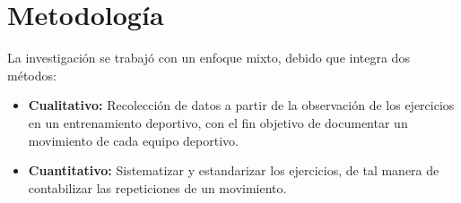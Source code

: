 \chapter{Metodolog\'ia}
La investigaci\'on se trabaj\'o con un enfoque mixto, debido que integra dos m\'etodos:
\begin{itemize}
	\item \textbf{Cualitativo:} Recolecci\'on de datos a partir de la observaci\'on de los ejercicios en un entrenamiento deportivo, con el fin objetivo de documentar un movimiento de cada equipo deportivo.
	\item \textbf{Cuantitativo:} Sistematizar y estandarizar los ejercicios, de tal manera de contabilizar las repeticiones de un movimiento.
\end{itemize}



